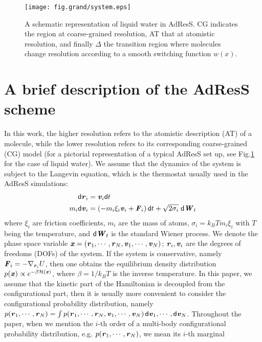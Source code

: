 \documentclass[aip,jcp,a4paper,reprint,onecolumn]{revtex4-1}
\newcommand{\vect}[1]{\textbf{\textit{#1}}}
\newcommand{\dd}[1]{\textsf{#1}}
\begin{document}
\begin{figure}
  \centering
  \texttt{[image: fig.grand/system.eps]}
  \caption{A schematic representation of liquid water in AdResS. CG indicates the region at coarse-grained resolution, AT that at atomistic resolution, and finally $\Delta$ the transition region where molecules change resolution according to a smooth switching function $w(x)$.}
  \label{fig:adress-water}
\end{figure}

\section{A brief description of the AdResS scheme}

In this work, the higher resolution refers to the atomistic
description (AT) of a molecule, while the lower resolution refers to
its corresponding coarse-grained (CG) model (for a pictorial representation of a typical AdResS set up, see Fig.\ref{fig:adress-water} for the case of liquid water).  We assume that the dynamics of the
system is subject to the Langevin equation, which is the thermostat
usually used in the AdResS simulations:
\begin{align}
  \dd d\vect r_i &= \vect v_i\dd dt\\
  m_i\dd d\vect v_i &= (-m_i\xi_i\vect v_i + \vect F_i)\,\dd dt + \sqrt{2\sigma_i}\;\dd d\vect W_t
\end{align}
where $\xi_i$ are friction coefficients,
$m_i$ are the mass of atoms, $\sigma_i = k_BTm_i\xi_i$ with $T$ being
the temperature, and
$\dd d\vect W_t$ is the standard Wiener process. We denote the
phase space variable $\vect x = (\vect r_1,\cdots,\vect r_N, \vect v_1,\cdots,\vect v_N)$; $\vect r_i,
\vect v_i$ are the degrees of freedoms (DOFs) of the system.  If the
system is conservative, namely $\vect F_i = -\nabla_{\vect r_i}U$,
then one obtains the equilibrium density distribution $p(\vect
x)\propto e^{-\beta\mathcal H(\vect x)}$, where $\beta = 1/k_BT$ is the inverse temperature.
  In this paper, we assume that
  the kinetic part of the Hamiltonian is decoupled from the configurational part, then
  it is usually more convenient to consider the configurational
  probability distribution, namely $ p(\vect r_1,\cdots,\vect r_N) =
  \int p(\vect r_1,\cdots,\vect r_N, \vect v_1,\cdots,\vect v_N)\,\dd d\vect v_1,\cdots,\dd d\vect v_N$.
Throughout the paper, when we mention the $i$-th order of a
  multi-body configurational probability distribution, e.g.
  $p(\vect r_1, \cdots, \vect r_N)$, we mean its $i$-th marginal
\end{document}
